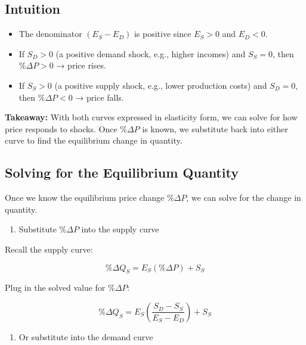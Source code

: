 \documentclass[
  letterpaper,
  DIV=11,
  numbers=noendperiod]{scrartcl}
\providecommand{\tightlist}{%
  \setlength{\itemsep}{0pt}\setlength{\parskip}{0pt}}
\begin{document}
\subsection{Intuition}\label{intuition}

\begin{itemize}
\tightlist
\item
  The denominator \((E_S - E_D)\) is positive since \(E_S > 0\) and
  \(E_D < 0\).\\
\item
  If \(S_D > 0\) (a positive demand shock, e.g., higher incomes) and
  \(S_S = 0\), then \(\% \Delta P > 0\) → price rises.\\
\item
  If \(S_S > 0\) (a positive supply shock, e.g., lower production costs)
  and \(S_D = 0\), then \(\% \Delta P < 0\) → price falls.
\end{itemize}

\textbf{Takeaway:} With both curves expressed in elasticity form, we can
solve for how price responds to shocks. Once \(\% \Delta P\) is known,
we substitute back into either curve to find the equilibrium change in
quantity.

\subsection{Solving for the Equilibrium
Quantity}\label{solving-for-the-equilibrium-quantity}

Once we know the equilibrium price change \(\% \Delta P\), we can solve
for the change in quantity.

\begin{enumerate}
\def\labelenumi{\arabic{enumi}.}
\tightlist
\item
  Substitute \(\% \Delta P\) into the supply curve
\end{enumerate}

Recall the supply curve:

\[
\% \Delta Q_S = E_S (\% \Delta P) + S_S
\]

Plug in the solved value for \(\% \Delta P\):

\[
\% \Delta Q_S = E_S \left( \frac{S_D - S_S}{E_S - E_D} \right) + S_S
\]

\begin{enumerate}
\def\labelenumi{\arabic{enumi}.}
\setcounter{enumi}{1}
\tightlist
\item
  Or substitute into the demand curve
\end{enumerate}
\end{document}
